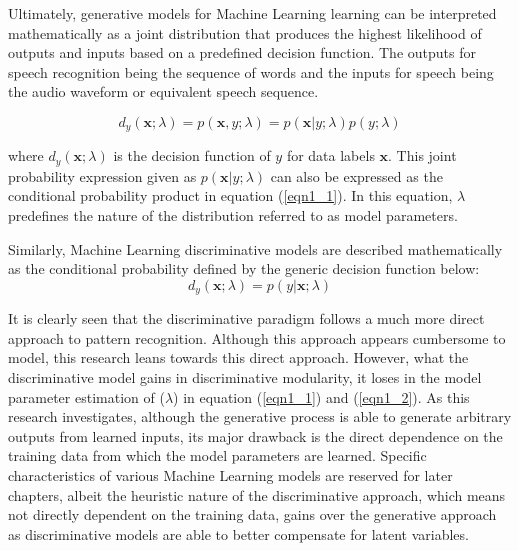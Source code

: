 Ultimately, generative models for Machine Learning learning can be interpreted mathematically as a joint distribution that produces the highest likelihood of outputs and inputs based on a predefined decision function.  The outputs for speech recognition being the sequence of words and the inputs for speech being the audio waveform or equivalent speech sequence.

\begin{equation}
d_y(\mathbf{x};\lambda)=p(\mathbf{x},y;\lambda)=p(\mathbf{x}|y;\lambda)p(y;\lambda)
\label{eqn1_1}
\end{equation}

where $d_y(\mathbf{x};\lambda)$ is the decision function of $y$ for data labels $\mathbf{x}$.  This joint probability expression given as $p(\mathbf{x}|y;\lambda)$ can also be expressed as the conditional probability product in equation (\ref{eqn1_1}).  In this equation, $\lambda$ predefines the nature of the distribution \citep{deng2013machine} referred to as model parameters.

Similarly, Machine Learning discriminative models are described mathematically as the conditional probability defined by the generic decision function below:
\begin{equation}
d_y(\mathbf{x};\lambda)=p(y|\mathbf{x};\lambda)
\label{eqn1_2}
\end{equation}

It is clearly seen that the discriminative paradigm follows a much more direct approach to pattern recognition. Although this approach appears cumbersome to model, this research leans towards this direct approach.  However, what the discriminative model gains in discriminative modularity, it loses in the model parameter estimation of ($\lambda$) in equation  (\ref{eqn1_1}) and (\ref{eqn1_2}).  
 As this research investigates, although the generative process is able to generate arbitrary outputs from learned inputs, its major drawback is the direct dependence on the training data from which the model parameters are learned. Specific characteristics of various Machine Learning models are reserved for later chapters, albeit the heuristic nature of the discriminative approach, which means not directly dependent on the training data,  gains over the generative approach as discriminative models are able to better compensate for latent variables\cite{gales2012structured}.  
 
